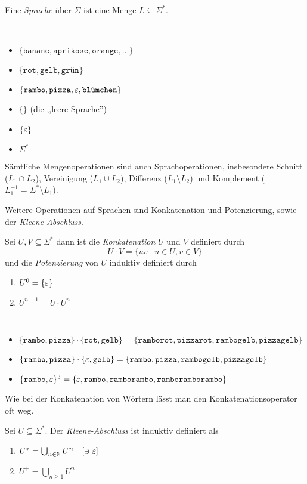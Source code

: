\begin{Def}[name={[Sprache über $\Sigma$]}]
	Eine \emph{Sprache} über $\Sigma$ ist eine Menge $L\subseteq\Sigma^*$.
\end{Def}
\begin{Bsp*}~ 
  \begin{itemize}
  \item 
	$\{\mathtt{banane}, \mathtt{aprikose},\mathtt{orange},\dots\}$
  \item
    $\{\mathtt{rot},\mathtt{gelb},\texttt{grün}\}$
  \item
    $\{\mathtt{rambo}, \mathtt{pizza}, \varepsilon, \texttt{blümchen}\}$
  \item $\{\}$ (die ,,leere Sprache'')
  \item $\{ \varepsilon \}$
  \item $\Sigma^*$
  \end{itemize}
\end{Bsp*}
Sämtliche Mengenoperationen sind auch Sprachoperationen, insbesondere Schnitt ($L_1 \cap L_2$), Vereinigung ($L_1 \cup L_2$), Differenz ($L_1 \setminus L_2$) und Komplement ($L_1^{-1} = \Sigma^* \setminus L_1$).

Weitere Operationen auf Sprachen sind Konkatenation und Potenzierung, sowie der \emph{Kleene Abschluss}.
\begin{Def} %
	Sei $U,V\subseteq \Sigma^*$ dann ist die \emph{Konkatenation} $U$ und $V$ definiert durch
	\[ U\cdot V = \{uv \mid u\in U, v\in V \} \]
  und die \emph{Potenzierung} von $U$ induktiv definiert durch
  \begin{enumerate}
  \item $U^0 = \{\varepsilon\}$
  \item $U^{n+1} = U \cdot U^{n}$
  \end{enumerate}
\end{Def}
\begin{Bsp*}~
  \begin{itemize}
  \item $\{\mathtt{rambo}, \mathtt{pizza}\} \cdot \{\mathtt{rot}, \mathtt{gelb}\} = \{\mathtt{ramborot}, \mathtt{pizzarot}, \mathtt{rambogelb}, \mathtt{pizzagelb}\}$
  \item $\{\mathtt{rambo}, \mathtt{pizza}\} \cdot \{\varepsilon, \mathtt{gelb}\} = \{\mathtt{rambo}, \mathtt{pizza}, \mathtt{rambogelb}, \mathtt{pizzagelb}\}$
  \item $\{\mathtt{rambo, \varepsilon}\}^3 = \{\mathtt{\varepsilon}, \mathtt{rambo}, \mathtt{ramborambo}, \mathtt{ramboramborambo}\}$
  \end{itemize}
\end{Bsp*}
Wie bei der Konkatenation von Wörtern lässt man den Konkatenationsoperator oft weg.
%
\begin{Def}
	Sei $U\subseteq\Sigma^*$.
  Der \emph{Kleene-Abschluss} ist induktiv definiert als
  \begin{enumerate}
  \item 
    $U^* = \bigcup_{n\in\mathbb{N}} U^n \quad [\ni\varepsilon]$
  \item
		$U^+ = \bigcup_{n\ge1} U^n$
  \end{enumerate}
\end{Def}

